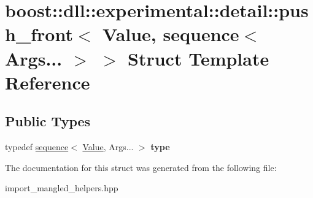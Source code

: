 \hypertarget{a01440}{}\section{boost\+:\+:dll\+:\+:experimental\+:\+:detail\+:\+:push\+\_\+front$<$ Value, sequence$<$ Args... $>$ $>$ Struct Template Reference}
\label{a01440}
\subsection*{Public Types}
\begin{DoxyCompactItemize}
\item 
\mbox{\label{a01440_a3f3ed50c281dc66f94de95ad5ae3535b}} 
typedef \hyperlink{a01432}{sequence}$<$ \hyperlink{a00476_a071cf97155ba72ac9a1fc4ad7e63d481}{Value}, Args... $>$ {\bfseries type}
\end{DoxyCompactItemize}


The documentation for this struct was generated from the following file\+:\begin{DoxyCompactItemize}
\item 
import\+\_\+mangled\+\_\+helpers.\+hpp\end{DoxyCompactItemize}
